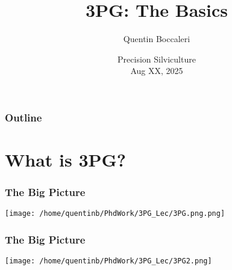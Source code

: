 \documentclass[11pt]{beamer}
\begin{document}
	\title[3PG: The Basics]{3PG: The Basics}%
	\author[Quentin Boccaleri]{Quentin Boccaleri}%
	
	\date[\textcolor{white}{Precision Silviculture, 2025}]
	{Precision Silviculture\\
		Aug XX, 2025}
		
	
	
	\begin{frame}
		\titlepage
	\end{frame}


\begin{frame}
	\frametitle{Outline}
	\tableofcontents
\end{frame}

\section{What is 3PG?}

\begin{frame}
	\frametitle{The Big Picture}
	\begin{center}
		\texttt{[image: /home/quentinb/PhdWork/3PG\_Lec/3PG.png.png]}
	\end{center}
\end{frame}

\begin{frame}
	\frametitle{The Big Picture}
	\begin{center}
		\texttt{[image: /home/quentinb/PhdWork/3PG\_Lec/3PG2.png]}
	\end{center}
\end{frame}
\end{document}
